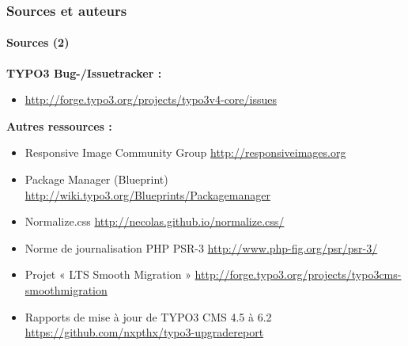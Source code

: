 
\begin{frame}[fragile]
	\frametitle{Sources et auteurs}
	\framesubtitle{Sources (2)}

	\textbf{TYPO3 Bug-/Issuetracker :}
		\begin{itemize}\smaller
			\item \url{http://forge.typo3.org/projects/typo3v4-core/issues}
		\end{itemize}

	\textbf{Autres ressources :}
		\begin{itemize}\smaller

			\item Responsive Image Community Group\newline
				\url{http://responsiveimages.org}

			\item Package Manager (Blueprint)\newline
				\url{http://wiki.typo3.org/Blueprints/Packagemanager}

			\item Normalize.css\newline
				\url{http://necolas.github.io/normalize.css/}

			\item Norme de journalisation PHP PSR-3\newline
				\url{http://www.php-fig.org/psr/psr-3/}

			\item Projet « LTS Smooth Migration » \newline
				\url{http://forge.typo3.org/projects/typo3cms-smoothmigration}

			\item Rapports de mise à jour de TYPO3 CMS 4.5 à 6.2
				\url{https://github.com/nxpthx/typo3-upgradereport}

		\end{itemize}

\end{frame}


